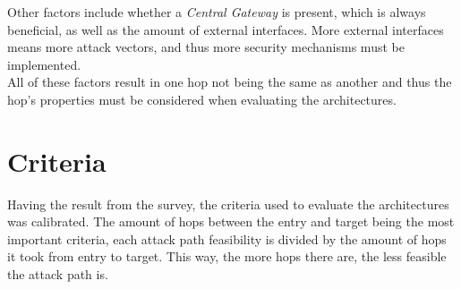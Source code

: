 Other factors include whether a \textit{Central Gateway} is present, which is always beneficial, as well as the amount of external interfaces.
More external interfaces means more attack vectors, and thus more security mechanisms must be implemented.\\

All of these factors result in one hop not being the same as another and thus the hop's properties must be considered when evaluating the architectures.

\section{Criteria}

Having the result from the survey, the criteria used to evaluate the architectures was calibrated.
The amount of hops between the entry and target being the most important criteria, each attack path feasibility is divided by the amount of hops it took from entry to target.
This way, the more hops there are, the less feasible the attack path is.